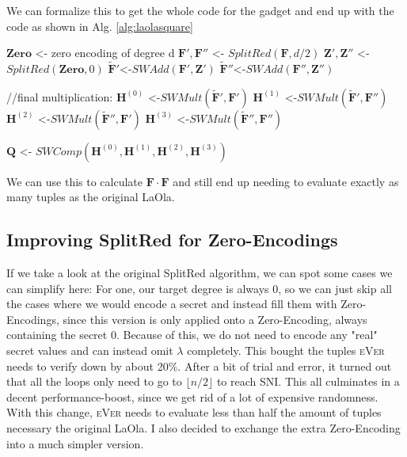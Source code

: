 \documentclass[english, version-2020-11]{uzl-thesis}
\newcommand{\toolname}[1]{\textsc{#1}}
\begin{document}
  We can formalize this to get the whole code for the gadget and end up with the code as shown in Alg. \ref{alg:laolasquare}
    


 \begin{Pseudocode}[caption={LaolaSquare}, label={alg:laolasquare}]
    $\mathbf{Zero}$ <- zero encoding of degree d
    $\mathbf{F'},\mathbf{F''}$ <- $SplitRed(\mathbf{F}, d/2)$
    $\mathbf{Z'},\mathbf{Z''}$ <- $SplitRed(\mathbf{Zero}, 0)$
    $\tilde{\mathbf{F}}' $<-$ SWAdd(\mathbf{F}',\mathbf{Z}')$
    $\tilde{\mathbf{F}}'' $<-$ SWAdd(\mathbf{F}'', \mathbf{Z}'')$
    
    //final multiplication:
    $\mathbf{H}^{(0)}$ <-$SWMult(\tilde{\mathbf{F}}',\mathbf{F}')$
    $\mathbf{H}^{(1)}$ <-$SWMult(\tilde{\mathbf{F}}',\mathbf{F}'')$
    $\mathbf{H}^{(2)}$ <-$SWMult(\tilde{\mathbf{F}}'',\mathbf{F}')$
    $\mathbf{H}^{(3)}$ <-$SWMult(\tilde{\mathbf{F}}'',\mathbf{F}'')$

    $\mathbf{Q}$ <- $SWComp(\mathbf{H}^{(0)},\mathbf{H}^{(1)},\mathbf{H}^{(2)},\mathbf{H}^{(3)}) $
    \end{Pseudocode}


   

    We can use this to calculate $\mathbf{F}\cdot \mathbf{F}$ and still end up needing to evaluate exactly as many tuples as the original LaOla.
\subsection{Improving SplitRed for Zero-Encodings}
    If we take a look at the original SplitRed algorithm, we can spot some cases we can simplify here:
    For one, our target degree is always 0, so we can just skip all the cases where we would encode a secret and instead fill them with Zero-Encodings,
    since this version is only applied onto a Zero-Encoding, always containing the secret 0. Because of this, we do not need to encode any "real" secret values and can instead omit $\lambda$ completely.
    This bought the tuples \toolname{eVer} needs to verify down by about 20\%.
    After a bit of trial and error, it turned out that all the loops only need to go to $\lfloor n/2 \rfloor$ to reach SNI. 
    This all culminates in a decent performance-boost, since we get rid of a lot of expensive randomness. With this change, \toolname{eVer} needs to evaluate less than half the amount of tuples necessary the original LaOla. I also decided to exchange the extra Zero-Encoding into a much simpler version.
\end{document}
